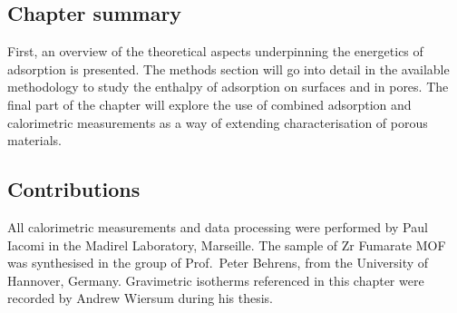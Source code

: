 \subsection*{Chapter summary}

First, an overview of the theoretical aspects underpinning
the energetics of adsorption is presented. The methods
section will go into detail in the available methodology
to study the enthalpy of adsorption on surfaces and in
pores. The final part of the chapter will explore the use
of combined adsorption and calorimetric measurements
as a way of extending characterisation of porous materials.

\subsection*{Contributions}

All calorimetric measurements and data processing were
performed by Paul Iacomi in the Madirel Laboratory, Marseille.
The sample of Zr Fumarate MOF was synthesised in the group
of Prof.\ Peter Behrens, from the University of Hannover,
Germany. Gravimetric isotherms referenced in this chapter were
recorded by Andrew Wiersum during his thesis.
